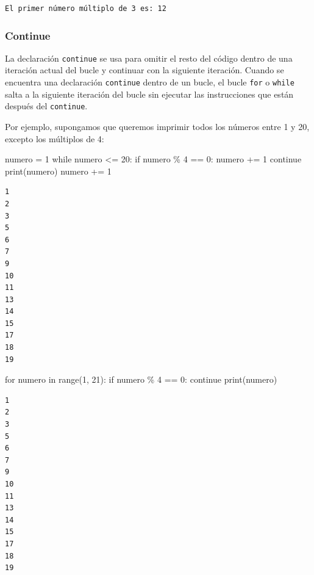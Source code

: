 \documentclass[
  letterpaper,
  DIV=11,
  numbers=noendperiod]{scrreprt}
\newenvironment{Shaded}{\begin{snugshade}}{\end{snugshade}}
\newcommand{\BuiltInTok}[1]{\textcolor[rgb]{0.00,0.23,0.31}{#1}}
\newcommand{\ControlFlowTok}[1]{\textcolor[rgb]{0.00,0.23,0.31}{#1}}
\newcommand{\DecValTok}[1]{\textcolor[rgb]{0.68,0.00,0.00}{#1}}
\newcommand{\KeywordTok}[1]{\textcolor[rgb]{0.00,0.23,0.31}{#1}}
\newcommand{\NormalTok}[1]{\textcolor[rgb]{0.00,0.23,0.31}{#1}}
\newcommand{\OperatorTok}[1]{\textcolor[rgb]{0.37,0.37,0.37}{#1}}
\begin{document}
\begin{verbatim}
El primer número múltiplo de 3 es: 12
\end{verbatim}

\hypertarget{continue}{%
\subsubsection{Continue}\label{continue}}

La declaración \texttt{continue} se usa para omitir el resto del código
dentro de una iteración actual del bucle y continuar con la siguiente
iteración. Cuando se encuentra una declaración \texttt{continue} dentro
de un bucle, el bucle \texttt{for} o \texttt{while} salta a la siguiente
iteración del bucle sin ejecutar las instrucciones que están después del
\texttt{continue}.

Por ejemplo, supongamos que queremos imprimir todos los números entre 1
y 20, excepto los múltiplos de 4:

\begin{Shaded}
\begin{Highlighting}[]
\NormalTok{numero }\OperatorTok{=} \DecValTok{1}
\ControlFlowTok{while}\NormalTok{ numero }\OperatorTok{\textless{}=} \DecValTok{20}\NormalTok{:}
  \ControlFlowTok{if}\NormalTok{ numero }\OperatorTok{\%} \DecValTok{4} \OperatorTok{==} \DecValTok{0}\NormalTok{:}
\NormalTok{      numero }\OperatorTok{+=} \DecValTok{1}
      \ControlFlowTok{continue}
  \BuiltInTok{print}\NormalTok{(numero)}
\NormalTok{  numero }\OperatorTok{+=} \DecValTok{1}
\end{Highlighting}
\end{Shaded}

\begin{verbatim}
1
2
3
5
6
7
9
10
11
13
14
15
17
18
19
\end{verbatim}

\begin{Shaded}
\begin{Highlighting}[]
\ControlFlowTok{for}\NormalTok{ numero }\KeywordTok{in} \BuiltInTok{range}\NormalTok{(}\DecValTok{1}\NormalTok{, }\DecValTok{21}\NormalTok{):}
  \ControlFlowTok{if}\NormalTok{ numero }\OperatorTok{\%} \DecValTok{4} \OperatorTok{==} \DecValTok{0}\NormalTok{:}
      \ControlFlowTok{continue}
  \BuiltInTok{print}\NormalTok{(numero)}
\end{Highlighting}
\end{Shaded}

\begin{verbatim}
1
2
3
5
6
7
9
10
11
13
14
15
17
18
19
\end{verbatim}
\end{document}
